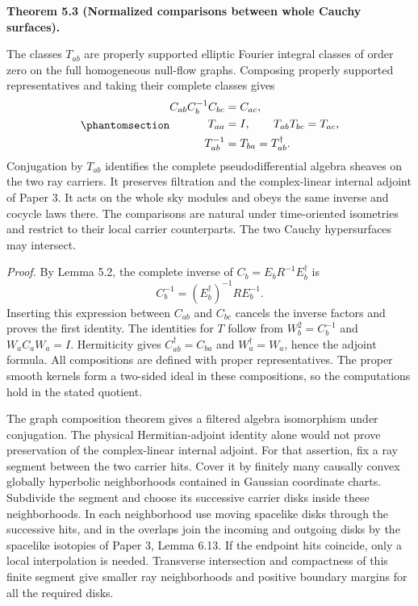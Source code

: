 \documentclass[
  english,
  11pt,
  reqno]{amsart}
\makeatletter
\newcommand{\pandocstatementheading}[1]{%
  \par\if@nobreak\else
    \addpenalty{\@beginparpenalty}%
    \addvspace{.5\baselineskip plus .2\baselineskip minus .2\baselineskip}%
  \fi
  {\normalfont\bfseries #1\par}%
  \nobreak\@afterindenttrue\@afterheading
}
\makeatother
\begin{document}
\pandocstatementheading{\protect{}\label{thm:global-carrier-cocycle}Theorem 5.3 (Normalized comparisons between whole Cauchy surfaces).}

The classes \(T_{ab}\) are properly supported elliptic Fourier integral
classes of order zero on the full homogeneous null-flow graphs.
Composing properly supported representatives and taking their complete
classes gives
\begin{equation}\protect\phantomsection\label{eq:global-carrier-cocycle}{
\begin{aligned}
C_{ab}C_b^{-1}C_{bc}&=C_{ac},\\
T_{aa}&=I,\qquad T_{ab}T_{bc}=T_{ac},\\
T_{ab}^{-1}&=T_{ba}=T_{ab}^\dagger .
\end{aligned}
}\end{equation} Conjugation by \(T_{ab}\) identifies the complete
pseudodifferential algebra sheaves on the two ray carriers. It preserves
filtration and the complex-linear internal adjoint of Paper 3. It acts
on the whole sky modules and obeys the same inverse and cocycle laws
there. The comparisons are natural under time-oriented isometries and
restrict to their local carrier counterparts. The two Cauchy
hypersurfaces may intersect.

\emph{Proof.} By Lemma 5.2, the complete inverse of
\(C_b=E_bR^{-1}E_b^\dagger\) is \[
C_b^{-1}=(E_b^\dagger)^{-1}R E_b^{-1}.
\] Inserting this expression between \(C_{ab}\) and \(C_{bc}\) cancels
the inverse factors and proves the first identity. The identities for
\(T\) follow from \(W_b^2=C_b^{-1}\) and \(W_aC_aW_a=I\). Hermiticity
gives \(C_{ab}^\dagger=C_{ba}\) and \(W_a^\dagger=W_a\), hence the
adjoint formula. All compositions are defined with proper
representatives. The proper smooth kernels form a two-sided ideal in
these compositions, so the computations hold in the stated quotient.

The graph composition theorem gives a filtered algebra isomorphism under
conjugation. The physical Hermitian-adjoint identity alone would not
prove preservation of the complex-linear internal adjoint. For that
assertion, fix a ray segment between the two carrier hits. Cover it by
finitely many causally convex globally hyperbolic neighborhoods
contained in Gaussian coordinate charts. Subdivide the segment and
choose its successive carrier disks inside these neighborhoods. In each
neighborhood use moving spacelike disks through the successive hits, and
in the overlaps join the incoming and outgoing disks by the spacelike
isotopies of Paper 3, Lemma 6.13. If the endpoint hits coincide, only a
local interpolation is needed. Transverse intersection and compactness
of this finite segment give smaller ray neighborhoods and positive
boundary margins for all the required disks.
\end{document}
